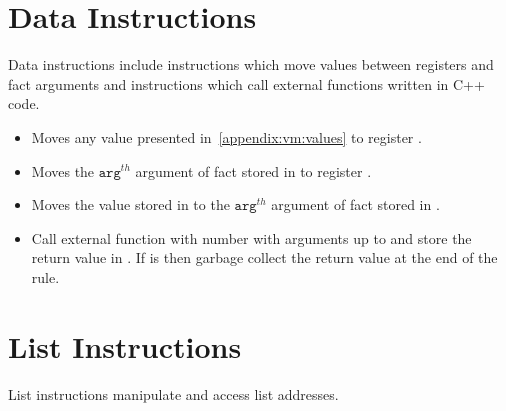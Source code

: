 \section{Data Instructions}

Data instructions include instructions which move values between registers and fact arguments and
instructions which call external functions written in C++ code.

\begin{itemize}
   \item {}

      Moves any value presented in~\ref{appendix:vm:values} to register .

   \item {}

      Moves the $\mathtt{arg}^{th}$ argument of fact stored in  to
      register .

   \item {}

      Moves the value stored in  to the $\mathtt{arg}^{th}$ argument of
      fact stored in .

   \item {}

      Call external function with number  with  arguments
       up to  and store the return value in .
      If  is  then garbage collect the return value at the
      end of the rule.

\end{itemize}

\section{List Instructions}

List instructions manipulate and access list addresses.

